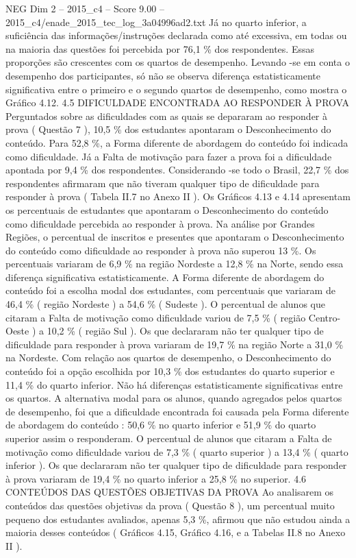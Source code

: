 \begin{textsample}{NEG Dim 2 – 2015\_c4 – Score 9.00 – 2015\_c4/enade\_2015\_tec\_log\_3a04996ad2.txt}
Já no quarto inferior, a suficiência das informações/instruções declarada como até excessiva, em todas ou na maioria das questões foi percebida por 76,1 \% dos respondentes.
Essas proporções são crescentes com os quartos de desempenho.
Levando -se em conta o desempenho dos participantes, só não se observa diferença estatisticamente significativa entre o primeiro e o segundo quartos de desempenho, como mostra o Gráfico 4.12. 4.5 DIFICULDADE ENCONTRADA AO RESPONDER À PROVA Perguntados sobre as dificuldades com as quais se depararam ao responder à prova ( Questão 7 ), 10,5 \% dos estudantes apontaram o Desconhecimento do conteúdo.
Para 52,8 \%, a Forma diferente de abordagem do conteúdo foi indicada como dificuldade.
Já a Falta de motivação para fazer a prova foi a dificuldade apontada por 9,4 \% dos respondentes.
Considerando -se todo o Brasil, 22,7 \% dos respondentes afirmaram que não tiveram qualquer tipo de dificuldade para responder à prova ( Tabela II.7 no Anexo II ).
Os Gráficos 4.13 e 4.14 apresentam os percentuais de estudantes que apontaram o Desconhecimento do conteúdo como dificuldade percebida ao responder à prova.
Na análise por Grandes Regiões, o percentual de inscritos e presentes que apontaram o Desconhecimento do conteúdo como dificuldade ao responder à prova não superou 13 \%.
Os percentuais variaram de 6,9 \% na região Nordeste a 12,8 \% na Norte, sendo essa diferença significativa estatisticamente.
A Forma diferente de abordagem do conteúdo foi a escolha modal dos estudantes, com percentuais que variaram de 46,4 \% ( região Nordeste ) a 54,6 \% ( Sudeste ).
O percentual de alunos que citaram a Falta de motivação como dificuldade variou de 7,5 \% ( região Centro-Oeste ) a 10,2 \% ( região Sul ).
Os que declararam não ter qualquer tipo de dificuldade para responder à prova variaram de 19,7 \% na região Norte a 31,0 \% na Nordeste.
Com relação aos quartos de desempenho, o Desconhecimento do conteúdo foi a opção escolhida por 10,3 \% dos estudantes do quarto superior e 11,4 \% do quarto inferior.
Não há diferenças estatisticamente significativas entre os quartos.
A alternativa modal para os alunos, quando agregados pelos quartos de desempenho, foi que a dificuldade encontrada foi causada pela Forma diferente de abordagem do conteúdo : 50,6 \% no quarto inferior e 51,9 \% do quarto superior assim o responderam.
O percentual de alunos que citaram a Falta de motivação como dificuldade variou de 7,3 \% ( quarto superior ) a 13,4 \% ( quarto inferior ).
Os que declararam não ter qualquer tipo de dificuldade para responder à prova variaram de 19,4 \% no quarto inferior a 25,8 \% no superior. 4.6 CONTEÚDOS DAS QUESTÕES OBJETIVAS DA PROVA Ao analisarem os conteúdos das questões objetivas da prova ( Questão 8 ), um percentual muito pequeno dos estudantes avaliados, apenas 5,3 \%, afirmou que não estudou ainda a maioria desses conteúdos ( Gráficos 4.15, Gráfico 4.16, e a Tabelas II.8 no Anexo II ).

\end{textsample}
